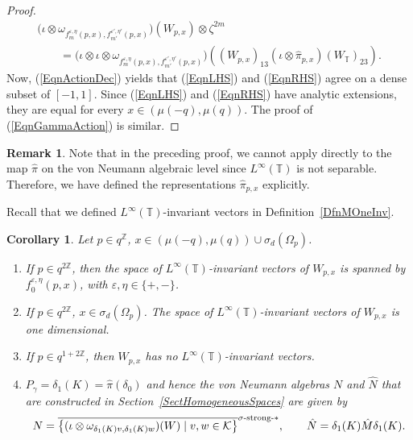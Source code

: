\documentclass[pdftex]{sigma}
\numberwithin{equation}{section}
\newtheorem{cor}[thm]{Corollary}
\theoremstyle{definition}
\newtheorem{rmk}[thm]{Remark}
\newcommand{\ep}{\varepsilon}
\begin{document}
\begin{proof}
\begin{gather*}
 \big(\iota \otimes \omega_{ f_m^{\ep,\eta}(p,x), f_{m'}^{\ep',\eta'}(p,x) }\big)(W_{p,x}) \otimes \zeta^{2m}\\
  \qquad {}= \big(\iota \otimes \iota \otimes \omega_{ f_m^{\ep,\eta}(p,x) , f_{m'}^{\ep',\eta'} (p,x) }\big) \left( (W_{p,x})_{13} (\iota \otimes \hat{\pi}_{p,x})(W_{\mathbb{T}})_{23} \right).
\end{gather*}
Now, (\ref{EqnActionDec}) yields that (\ref{EqnLHS}) and (\ref{EqnRHS}) agree on a dense subset of $[-1,1]$. Since (\ref{EqnLHS}) and (\ref{EqnRHS}) have analytic extensions, they are equal for every $x \in (\mu(-q), \mu(q))$.
The proof of (\ref{EqnGammaAction}) is similar.
\end{proof}

\begin{rmk}
Note that in the preceding proof, we cannot apply \cite[Theorem~IV.8.25]{TakI} directly to the map $\hat{\pi}$ on the von Neumann algebraic level since $L^\infty(\mathbb{T})$ is not separable. Therefore, we have def\/ined the representations $\hat{\pi}_{p,x}$ explicitly.
\end{rmk}

Recall that we def\/ined $L^\infty(\mathbb{T})$-invariant vectors in Def\/inition~\ref{DfnMOneInv}.

\begin{cor}\label{CorHom}
Let $p \in q^{\mathbb{Z}}$,  $x \in ( \mu(-q), \mu(q))\cup \sigma_d(\Omega_p)$.
\begin{enumerate}\itemsep=0pt
\item\label{ItemCorZero} If $p \in q^{2 \mathbb{Z}}$, then the space of $L^\infty(\mathbb{T})$-invariant vectors of  $W_{p,x}$ is spanned by $f_0^{\ep, \eta}(p,x)$, with $\ep, \eta \in \{ +, -\}$.
\item\label{ItemCorI} If $p \in q^{2 \mathbb{Z}}$, $x \in \sigma_d(\Omega_p)$.  The space of $L^\infty(\mathbb{T})$-invariant vectors of $W_{p,x}$ is one dimensional.
\item\label{ItemCorII}  If $p \in q^{1 + 2 \mathbb{Z}}$, then $W_{p,x}$ has no $L^\infty(\mathbb{T})$-invariant vectors.
\item\label{ItemHomIV} $P_\gamma = \delta_1(K) = \hat{\pi}(\delta_0)$ and hence the von Neumann algebras $N$ and $\hat{N}$ that are constructed in Section~{\rm \ref{SectHomogeneousSpaces}} are given by
\begin{gather*}
N  = \overline{\left\{
(\iota \otimes \omega_{\delta_1(K) v, \delta_1(K) w})(W) \mid v,w \in   \mathcal{K}
\right\} }^{\sigma\text{\rm -strong-}\ast} ,\qquad
\hat{N}  =   \delta_1(K) \hat{M} \delta_1(K).
\end{gather*}
\end{enumerate}
\end{cor}
\end{document}

